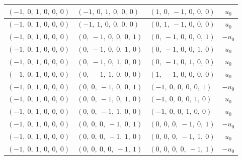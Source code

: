 \documentclass[11pt]{article}
\theoremstyle{definition}
\begin{document}
\begin{longtable}{|l|l|l|c|}
    \hline
    $\left( -1, \  0, \  1, \  0, \  0, \  0\right)$ & $\left( -1, \  0, \  1, \  0, \  0, \  0\right)$ & $\left( 1, \  0, \  -1, \  0, \  0, \  0\right)$ & $u_{0}$ \\
    \hline
    $\left( -1, \  0, \  1, \  0, \  0, \  0\right)$ & $\left( -1, \  1, \  0, \  0, \  0, \  0\right)$ & $\left( 0, \  1, \  -1, \  0, \  0, \  0\right)$ & $u_{0}$ \\
    \hline
    $\left( -1, \  0, \  1, \  0, \  0, \  0\right)$ & $\left( 0, \  -1, \  0, \  0, \  0, \  1\right)$ & $\left( 0, \  -1, \  0, \  0, \  0, \  1\right)$ & $- u_{0}$ \\
    \hline
    $\left( -1, \  0, \  1, \  0, \  0, \  0\right)$ & $\left( 0, \  -1, \  0, \  0, \  1, \  0\right)$ & $\left( 0, \  -1, \  0, \  0, \  1, \  0\right)$ & $u_{0}$ \\
    \hline
    $\left( -1, \  0, \  1, \  0, \  0, \  0\right)$ & $\left( 0, \  -1, \  0, \  1, \  0, \  0\right)$ & $\left( 0, \  -1, \  0, \  1, \  0, \  0\right)$ & $u_{0}$ \\
    \hline
    $\left( -1, \  0, \  1, \  0, \  0, \  0\right)$ & $\left( 0, \  -1, \  1, \  0, \  0, \  0\right)$ & $\left( 1, \  -1, \  0, \  0, \  0, \  0\right)$ & $u_{0}$ \\
    \hline
    $\left( -1, \  0, \  1, \  0, \  0, \  0\right)$ & $\left( 0, \  0, \  -1, \  0, \  0, \  1\right)$ & $\left( -1, \  0, \  0, \  0, \  0, \  1\right)$ & $- u_{0}$ \\
    \hline
    $\left( -1, \  0, \  1, \  0, \  0, \  0\right)$ & $\left( 0, \  0, \  -1, \  0, \  1, \  0\right)$ & $\left( -1, \  0, \  0, \  0, \  1, \  0\right)$ & $u_{0}$ \\
    \hline
    $\left( -1, \  0, \  1, \  0, \  0, \  0\right)$ & $\left( 0, \  0, \  -1, \  1, \  0, \  0\right)$ & $\left( -1, \  0, \  0, \  1, \  0, \  0\right)$ & $u_{0}$ \\
    \hline
    $\left( -1, \  0, \  1, \  0, \  0, \  0\right)$ & $\left( 0, \  0, \  0, \  -1, \  0, \  1\right)$ & $\left( 0, \  0, \  0, \  -1, \  0, \  1\right)$ & $- u_{0}$ \\
    \hline
    $\left( -1, \  0, \  1, \  0, \  0, \  0\right)$ & $\left( 0, \  0, \  0, \  -1, \  1, \  0\right)$ & $\left( 0, \  0, \  0, \  -1, \  1, \  0\right)$ & $u_{0}$ \\
    \hline
    $\left( -1, \  0, \  1, \  0, \  0, \  0\right)$ & $\left( 0, \  0, \  0, \  0, \  -1, \  1\right)$ & $\left( 0, \  0, \  0, \  0, \  -1, \  1\right)$ & $- u_{0}$ \\

\end{longtable}
\end{document}
